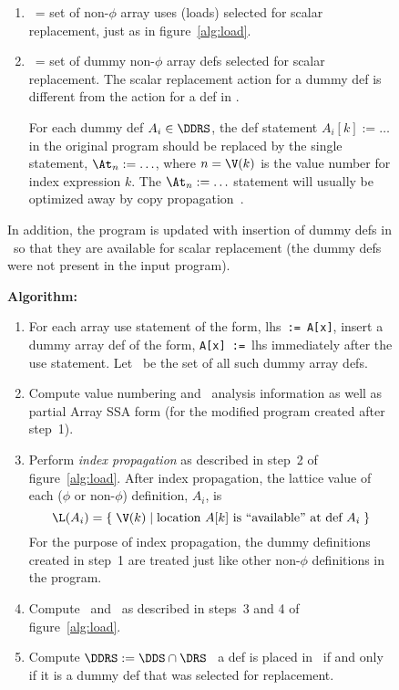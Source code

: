 {\begin{figure}
\begin{enumerate}
\item \URS\ = set of non-$\phi$ array uses (loads) selected for scalar replacement,
just as in figure~\ref{alg:load}.  

\item \DDRS\ = set of dummy non-$\phi$ array defs selected for scalar replacement.  The scalar replacement action for a dummy def is different from the
action for a def in \DRS.

For each dummy def $A_i \in \DDRS$,
the def
statement $A_i[k] := \ldots$ in the original program should be replaced by
the single statement, $\At_n := \ldots$,
where $n=\V(k)$ is the value number for index expression $k$.
The $\At_n := \ldots$ statement will usually be optimized away
by copy propagation~\cite{AhSU86}.
\end{enumerate}

In addition, the program is updated with insertion of dummy defs in
\DDRS\ so that they are available for scalar replacement (the dummy
defs were not present in the input program).
\vspace{12pt}

{\bf Algorithm:}
\begin{enumerate}
\item For each array use statement of the form, {\sc lhs}~{\tt :=~A[x]},
insert a dummy array def of the form, {\tt A[x]~:=}~{\sc lhs} immediately
after the use statement.  Let \DDS\ be the set of all such dummy array defs.

\item Compute value numbering and \dd\ analysis information as
well as partial Array SSA form (for the
modified program created after step~1).

\item Perform {\it index propagation} as described in step~2 of
figure~\ref{alg:load}.
After index propagation, the lattice value of each ($\phi$ or non-$\phi$) definition, $A_i$,
is 
$$\L(A_i) = \{\; \V(k) \; | \;
\mbox{location $A[k]$ is ``available'' at def $A_i$} \; \}$$
For the purpose of index propagation,
the dummy definitions created in step~1 are treated just like other non-$\phi$
definitions in the program.

\item Compute \URS\ and \DRS\ as described in steps~3 and 4 of
figure~\ref{alg:load}.

\item Compute $\DDRS := \DDS \cap \DRS$ \ie\ a def is placed in \DDRS\ if
and only if it is a dummy def that was selected for replacement.


\end{enumerate}
\end{figure}}
